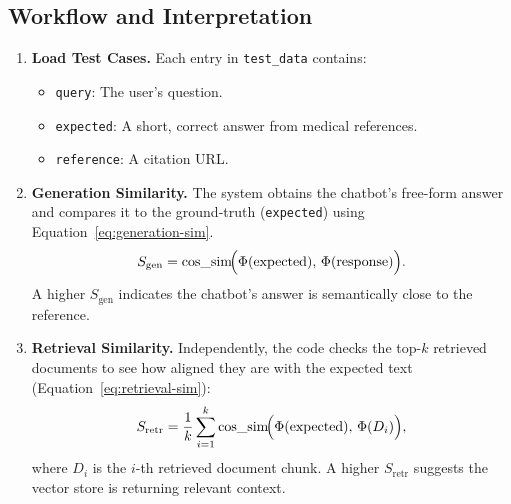 \subsection{Workflow and Interpretation}
\begin{enumerate}
    \item \textbf{Load Test Cases.} Each entry in \texttt{test\_data} contains:
    \begin{itemize}
        \item \texttt{query}: The user’s question.
        \item \texttt{expected}: A short, correct answer from medical references.
        \item \texttt{reference}: A citation URL.
    \end{itemize}
    \item \textbf{Generation Similarity.}  
    The system obtains the chatbot’s free-form answer and compares it to the ground-truth (\texttt{expected}) using Equation~\ref{eq:generation-sim}. 
    \begin{equation}
      S_\mathrm{gen} = \text{cos\_sim}\!\Bigl(\Phi(\text{expected}), \,\Phi(\text{response})\Bigr).
      \label{eq:generation-sim}
    \end{equation}
    A higher $S_\mathrm{gen}$ indicates the chatbot’s answer is semantically close to the reference.

    \item \textbf{Retrieval Similarity.}  
    Independently, the code checks the top-$k$ retrieved documents to see how aligned they are with the expected text (Equation~\ref{eq:retrieval-sim}):
    \begin{equation}
      S_\mathrm{retr} = \frac{1}{k} \sum_{i=1}^k \text{cos\_sim}\!\Bigl(\Phi(\text{expected}), \,\Phi(D_i)\Bigr),
      \label{eq:retrieval-sim}
    \end{equation}
    where $D_i$ is the $i$-th retrieved document chunk. A higher $S_\mathrm{retr}$ suggests the vector store is returning relevant context.
\end{enumerate}

